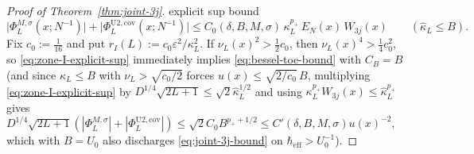 \documentclass[11pt]{article}
\theoremstyle{definition}
\theoremstyle{remark}
\newcommand{\heff}{\hbar_{\mathrm{eff}}}
\renewcommand{\_}{\oldunderscore\penalty0\hskip0pt\relax}
\begin{document}
\begin{proof}[Proof of Theorem~\ref{thm:joint-3j}]
  explicit sup bound
\begin{equation}
  \bigl|\Phi_L^{M,\sigma}(x;N^{-1})\bigr| + \bigl|\Phi_L^{\mathrm{U2,cov}}(x;N^{-1})\bigr| \le
    C_0(\delta,B,M,\sigma)\,\kappa_L^{p_+}\,E_N(x)\,W_{3j}(x)\qquad (\hat{\kappa}_L\le B).
  \label{eq:zone-I-explicit-sup}
\end{equation}
Fix $c_0:=\frac{1}{16}$ and put $r_I(L):=c_0\varepsilon^2/\kappa_L^2$. If $\nu_L(x)^2>\frac12 c_0$, then $\nu_L(x)^4>\frac14
  c_0^2$, so \eqref{eq:zone-I-explicit-sup} immediately implies \eqref{eq:bessel-toe-bound} with $C_B=B$ (and since
  $\hat{\kappa}_L\le B$ with $\nu_L>\sqrt{c_0/2}$ forces $u(x)\le\sqrt{2/c_0}\,B$, multiplying \eqref{eq:zone-I-explicit-sup} by
  $D^{1/4}\sqrt{2L+1}\le\sqrt{2}\hat{\kappa}_L^{1/2}$ and using $\kappa_L^{p_+}W_{3j}(x)\le\hat{\kappa}_L^{p_+}$ gives
  $D^{1/4}\sqrt{2L+1}(|\Phi_L^{M,\sigma}|+|\Phi_L^{\mathrm{U2,cov}}|)\le\sqrt{2}C_0 B^{p_++1/2}\le
  C'(\delta,B,M,\sigma)u(x)^{-2}$, which with $B=U_0$ also discharges \eqref{eq:joint-3j-bound} on $\heff>U_0^{-1}$).


\end{proof}
\end{document}
